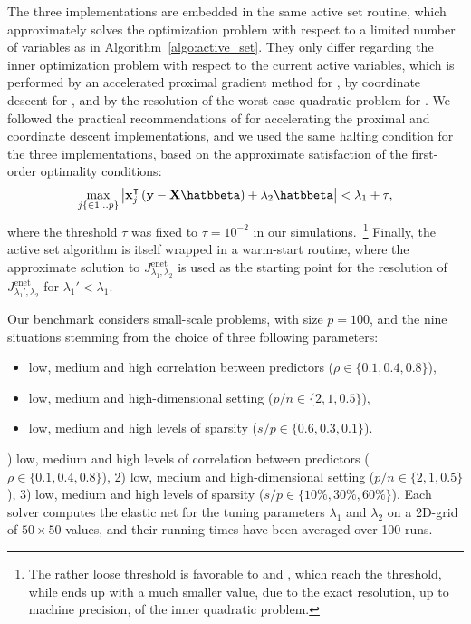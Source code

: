 The three implementations are embedded in the same active set routine, which
approximately solves the optimization problem with respect to a limited number
of variables as in Algorithm~\ref{algo:active_set}.
They only differ regarding the inner optimization problem with respect to the
current active variables, which is performed by an
accelerated proximal gradient method for , by coordinate descent
for  , and by the resolution of the worst-case quadratic
problem for .
We followed the practical recommendations of \citet{2012_FML_Bach} for
accelerating the proximal and coordinate descent implementations, and we used
the same halting condition for the three implementations, based on the
approximate satisfaction of the first-order optimality conditions:
\begin{equation}
  \label{eq:tau_conv}
  \max_{j\{\in 1\dots p\}} \left| \mathbf{x}_j^\intercal\left(\mathbf{y}
      -\mathbf{X}\hatbbeta                 
    \right) + \lambda_2\hatbbeta \right| <
  \lambda_1 + \tau,
\end{equation}
where the threshold $\tau$ was fixed to $\tau=10^{-2}$ in our simulations.~\footnote{%
  The rather loose threshold is favorable to  and
  , which reach the threshold, while 
  ends up with a much smaller value, due to the exact resolution, up to
  machine precision, of the inner quadratic problem.
}
Finally, the active set algorithm is itself wrapped in a warm-start routine,
where the approximate solution to $J^{\text{enet}}_{\lambda_1,\lambda_2}$ is
used as the starting point for the resolution of
$J^{\text{enet}}_{\lambda_1',\lambda_2}$ for $\lambda_1' < \lambda_1$.

Our benchmark considers small-scale problems, with size $p=100$, and the nine
situations stemming from the choice of three following parameters:
\iflong
\begin{itemize}
\item low,  medium  and  high correlation between predictors ($\rho \in \{0.1, 0.4, 0.8\}$),
\item low, medium and  high-dimensional setting ($p/n \in \{2, 1,
  0.5\}$),
\item low, medium and high levels of sparsity ($s/p\in\{0.6 ,0.3,0.1\}$).
\end{itemize}
) low,  medium  and  high levels of correlation between predictors ($\rho \in \{0.1, 0.4, 0.8\}$),
2) low, medium and  high-dimensional setting ($p/n \in \{2, 1, 0.5\}$),
3) low, medium and high levels of sparsity ($s/p\in\{10\% ,30\%,60\%\}$).
\fi
Each solver computes the elastic net for the tuning parameters $\lambda_1$ and
$\lambda_2$ on a 2D-grid of $50 \times 50$ values, and their running 
times have been averaged over 100 runs.

